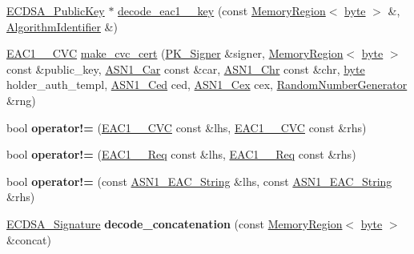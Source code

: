 \begin{DoxyCompactItemize}
\item 
\hyperlink{classBotan_1_1ECDSA__PublicKey}{E\-C\-D\-S\-A\-\_\-\-Public\-Key} $\ast$ \hyperlink{namespaceBotan_a52577a13374a1d04cbd9c4a3f077e95c}{decode\-\_\-eac1\-\_\-\_\-key} (const \hyperlink{classBotan_1_1MemoryRegion}{Memory\-Region}$<$ \hyperlink{namespaceBotan_a7d793989d801281df48c6b19616b8b84}{byte} $>$ \&, \hyperlink{classBotan_1_1AlgorithmIdentifier}{Algorithm\-Identifier} \&)
\item 
\hyperlink{classBotan_1_1EAC1__1__CVC}{E\-A\-C1\-\_\-\_\-\-C\-V\-C} \hyperlink{namespaceBotan_af9882f8ae7e7435be7f6120ba165b924}{make\-\_\-cvc\-\_\-cert} (\hyperlink{classBotan_1_1PK__Signer}{P\-K\-\_\-\-Signer} \&signer, \hyperlink{classBotan_1_1MemoryRegion}{Memory\-Region}$<$ \hyperlink{namespaceBotan_a7d793989d801281df48c6b19616b8b84}{byte} $>$ const \&public\-\_\-key, \hyperlink{classBotan_1_1ASN1__Car}{A\-S\-N1\-\_\-\-Car} const \&car, \hyperlink{classBotan_1_1ASN1__Chr}{A\-S\-N1\-\_\-\-Chr} const \&chr, \hyperlink{namespaceBotan_a7d793989d801281df48c6b19616b8b84}{byte} holder\-\_\-auth\-\_\-templ, \hyperlink{classBotan_1_1ASN1__Ced}{A\-S\-N1\-\_\-\-Ced} ced, \hyperlink{classBotan_1_1ASN1__Cex}{A\-S\-N1\-\_\-\-Cex} cex, \hyperlink{classBotan_1_1RandomNumberGenerator}{Random\-Number\-Generator} \&rng)
\item 
\hypertarget{namespaceBotan_aaa21d6a48ff89e1854660f40f47a5432}{bool {\bfseries operator!=} (\hyperlink{classBotan_1_1EAC1__1__CVC}{E\-A\-C1\-\_\-\_\-\-C\-V\-C} const \&lhs, \hyperlink{classBotan_1_1EAC1__1__CVC}{E\-A\-C1\-\_\-\_\-\-C\-V\-C} const \&rhs)}\label{namespaceBotan_aaa21d6a48ff89e1854660f40f47a5432}

\item 
\hypertarget{namespaceBotan_a9e75c9963cf016dee381dbafb8c2e6dd}{bool {\bfseries operator!=} (\hyperlink{classBotan_1_1EAC1__1__Req}{E\-A\-C1\-\_\-\_\-\-Req} const \&lhs, \hyperlink{classBotan_1_1EAC1__1__Req}{E\-A\-C1\-\_\-\_\-\-Req} const \&rhs)}\label{namespaceBotan_a9e75c9963cf016dee381dbafb8c2e6dd}

\item 
\hypertarget{namespaceBotan_af08682ea13a22b77ee1306e2bc47e424}{bool {\bfseries operator!=} (const \hyperlink{classBotan_1_1ASN1__EAC__String}{A\-S\-N1\-\_\-\-E\-A\-C\-\_\-\-String} \&lhs, const \hyperlink{classBotan_1_1ASN1__EAC__String}{A\-S\-N1\-\_\-\-E\-A\-C\-\_\-\-String} \&rhs)}\label{namespaceBotan_af08682ea13a22b77ee1306e2bc47e424}

\item 
\hypertarget{namespaceBotan_ac4ef960bf65501029d7e96fa39478086}{\hyperlink{classBotan_1_1ECDSA__Signature}{E\-C\-D\-S\-A\-\_\-\-Signature} {\bfseries decode\-\_\-concatenation} (const \hyperlink{classBotan_1_1MemoryRegion}{Memory\-Region}$<$ \hyperlink{namespaceBotan_a7d793989d801281df48c6b19616b8b84}{byte} $>$ \&concat)}\label{namespaceBotan_ac4ef960bf65501029d7e96fa39478086}


\end{DoxyCompactItemize}

